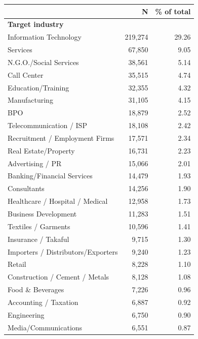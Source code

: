 \begin{tabular}{lrr}


\toprule


 & N & \% of total \\


\midrule


\multicolumn{3}{l}{\textbf{Target industry}}\\ 
\midrule
Information Technology&     219,274&       29.26\\
Services            &      67,850&        9.05\\
N.G.O./Social Services&      38,561&        5.14\\
Call Center         &      35,515&        4.74\\
Education/Training  &      32,355&        4.32\\
Manufacturing       &      31,105&        4.15\\
BPO                 &      18,879&        2.52\\
Telecommunication / ISP&      18,108&        2.42\\
Recruitment / Employment Firms&      17,571&        2.34\\
Real Estate/Property&      16,731&        2.23\\
Advertising / PR    &      15,066&        2.01\\
Banking/Financial Services&      14,479&        1.93\\
Consultants         &      14,256&        1.90\\
Healthcare / Hospital / Medical&      12,958&        1.73\\
Business Development&      11,283&        1.51\\
Textiles / Garments &      10,596&        1.41\\
Insurance / Takaful &       9,715&        1.30\\
Importers / Distributors/Exporters&       9,240&        1.23\\
Retail              &       8,228&        1.10\\
Construction / Cement / Metals&       8,128&        1.08\\
Food \& Beverages   &       7,226&        0.96\\
Accounting / Taxation&       6,887&        0.92\\
Engineering         &       6,750&        0.90\\
Media/Communications&       6,551&        0.87\\

\end{tabular}
